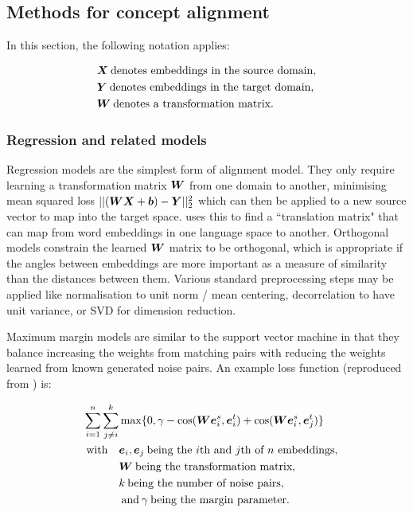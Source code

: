 \newpage
\subsection{Methods for concept alignment}

In this section, the following notation applies:

\begin{equation*}
\begin{split}
    &\boldsymbol{X} \medspace \text{denotes embeddings in the source domain},\\
    &\boldsymbol{Y} \medspace \text{denotes embeddings in the target domain},\\
    &\boldsymbol{W} \medspace \text{denotes a transformation matrix}.\\
\end{split}
\end{equation*}

\subsubsection{Regression and related models}

Regression models are the simplest form of alignment model. They only require learning a transformation matrix $\boldsymbol{W}$ from one domain to another, minimising mean squared loss $|| (\boldsymbol{W} \boldsymbol{X} + \boldsymbol{b}) - \boldsymbol{Y}||_2^2$ which can then be applied to a new source vector to map into the target space. \cite{MikolovMachineTranslation} uses this to find a ``translation matrix" that can map from word embeddings in one language space to another. Orthogonal models constrain the learned $\boldsymbol{W}$ matrix to be orthogonal, which is appropriate if the angles between embeddings are more important as a measure of similarity than the distances between them. Various standard preprocessing steps may be applied like normalisation to unit norm / mean centering, decorrelation to have unit variance, or SVD for dimension reduction.

Maximum margin models are similar to the support vector machine \cite{SVM} in that they balance increasing the weights from matching pairs with reducing the weights learned from known generated noise pairs. An example loss function (reproduced from \cite{kalinowski2020survey}) is:

\begin{equation*}
\begin{split}
\sum_{i=1}^n \sum_{j \neq i}^{k} &\max \{0, \gamma - \cos(\boldsymbol{W} \boldsymbol{e}_i^s, \boldsymbol{e}_i^t) + \cos(\boldsymbol{W} \boldsymbol{e}_i^s, \boldsymbol{e}_j^t)\}\\
\quad \text{with} \quad& \boldsymbol{e}_i, \boldsymbol{e}_j \medspace \text{being the $i$th and $j$th of $n$ embeddings},\\
& \boldsymbol{W} \medspace \text{being the transformation matrix},\\
& k \medspace \text{being the number of noise pairs}, \\
& \medspace \text{and}\medspace \gamma \medspace \text{being the margin parameter}.
\end{split}
\end{equation*}


